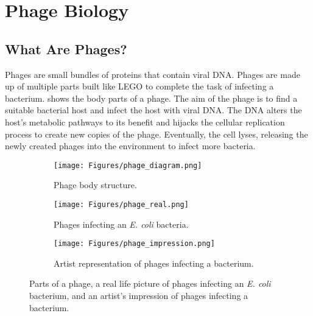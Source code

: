 \section{Phage Biology}
\subsection{What Are Phages?}
Phages are small bundles of proteins that contain viral DNA. 
Phages are made up of multiple parts built like LEGO to complete the task of infecting a bacterium. 
 shows the body parts of a phage. 
The aim of the phage is to find a suitable bacterial host and infect the host with viral DNA. 
The DNA alters the host's metabolic pathways to its benefit and hijacks the cellular replication process to create new copies of the phage. 
Eventually, the cell lyses, releasing the newly created phages into the environment to infect more bacteria. 
\begin{figure}[h!]
    \centering
    \begin{subfigure}{0.25\linewidth}
        \centering
        \captionsetup{width=1\linewidth}
        \texttt{[image: Figures/phage\_diagram.png]}
        \caption{
            Phage body structure. 
        }
        \label{fig:figures:phage_diagram}
    \end{subfigure}
    \hfill
    \begin{subfigure}{0.3\linewidth}
        \centering
        \captionsetup{width=1\linewidth}
        \texttt{[image: Figures/phage\_real.png]}
        \caption{
            Phages infecting an \textit{E. coli} bacteria. 
        }
        \label{fig:figures:phage_real}
    \end{subfigure}
    \hfill
    \begin{subfigure}{0.35\linewidth}
        \centering
        \captionsetup{width=1\linewidth}
        \texttt{[image: Figures/phage\_impression.png]}
        \caption{
            Artist representation of phages infecting a bacterium. 
        }
        \label{fig:figures:phage_impression}
    \end{subfigure}
    \caption{Parts of a phage, a real life picture of phages infecting an \textit{E. coli} bacterium, and an artist's impression of phages infecting a bacterium. }
\end{figure}

